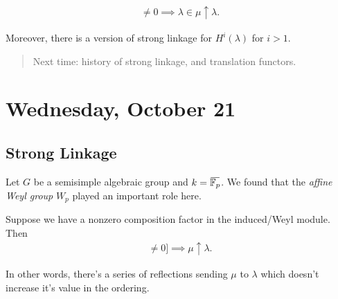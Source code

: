 \begin{theorem}

\begin{theorem}

\begin{align*}   [H^0(\lambda): L(\mu)] \neq 0 \implies \lambda \in \mu \uparrow \lambda .\end{align*}

Moreover, there is a version of strong linkage for \(H^i(\lambda)\) for
\(i> 1\).

\end{theorem}

\end{theorem}

\begin{quote}
Next time: history of strong linkage, and translation functors.
\end{quote}

\hypertarget{wednesday-october-21}{%
\section{Wednesday, October 21}\label{wednesday-october-21}}

\hypertarget{strong-linkage}{%
\subsection{Strong Linkage}\label{strong-linkage}}

Let \(G\) be a semisimple algebraic group and
\(k = \mkern 1.5mu\overline{\mkern-1.5mu{\mathbb{F}}_p\mkern-1.5mu}\mkern 1.5mu\).
We found that the \emph{affine Weyl group} \(W_p\) played an important
role here.

\begin{theorem}

\begin{theorem}

Suppose we have a nonzero composition factor in the induced/Weyl module.
Then
\begin{align*} [H^0 \lambda : L(\mu)] \neq 0]\implies \mu \uparrow \lambda .\end{align*}

In other words, there's a series of reflections sending \(\mu\) to
\(\lambda\) which doesn't increase it's value in the ordering.

\end{theorem}

\end{theorem}

